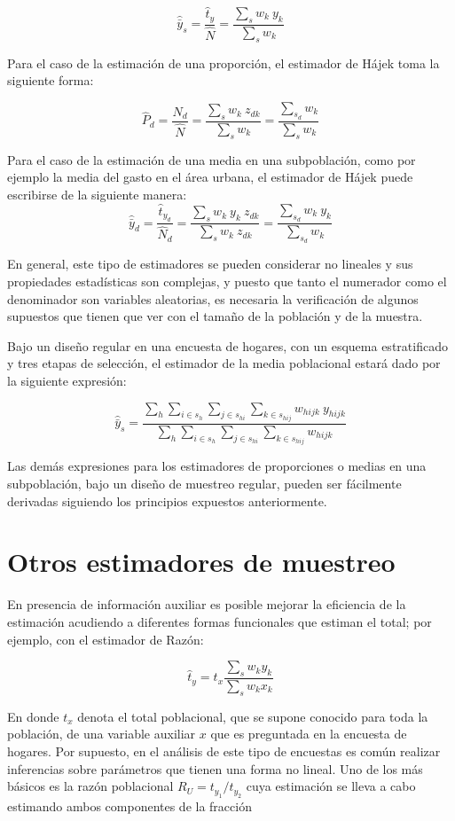 \documentclass[
  10pt,
  spanish,
]{book}
\begin{document}
\[
\hat{\bar{y}}_s=\frac{\hat t_y}{\hat N} = \frac{\sum_sw_k\ y_{k}}{\sum_sw_k}
\]

Para el caso de la estimación de una proporción, el estimador de Hájek toma la siguiente forma:

\[
\hat{P}_d=\frac{\hat N_d}{\hat N} = \frac{\sum_{s}w_k\ z_{dk}}{\sum_sw_k} = \frac{\sum_{s_d}w_k}{\sum_s w_k}
\]

Para el caso de la estimación de una media en una subpoblación, como por ejemplo la media del gasto en el área urbana, el estimador de Hájek puede escribirse de la siguiente manera:
\[
\hat{\bar{y}}_d=\frac{\hat t_{y_d}}{\hat N_d} = \frac{\sum_s w_k\ y_{k} \ z_{dk} }{\sum_s w_k \ z_{dk}} = \frac{\sum_{s_d} w_k\ y_{k}}{\sum_{s_d} w_k}
\]

En general, este tipo de estimadores se pueden considerar no lineales y sus propiedades estadísticas son complejas, y puesto que tanto el numerador como el denominador son variables aleatorias, es necesaria la verificación de algunos supuestos que tienen que ver con el tamaño de la población y de la muestra.

Bajo un diseño regular en una encuesta de hogares, con un esquema estratificado y tres etapas de selección, el estimador de la media poblacional estará dado por la siguiente expresión:

\[
\hat{\bar{y}}_s=\frac{\sum_h \sum_{i \in s_h} \sum_{j \in s_{hi}} \sum_{k \in s_{hij}} w_{hijk} \ y_{hijk}}{\sum_h \sum_{i \in s_h} \sum_{j \in s_{hi}} \sum_{k \in s_{hij}} w_{hijk} }
\]

Las demás expresiones para los estimadores de proporciones o medias en una subpoblación, bajo un diseño de muestreo regular, pueden ser fácilmente derivadas siguiendo los principios expuestos anteriormente.

\hypertarget{otros-estimadores-de-muestreo}{%
\section{Otros estimadores de muestreo}\label{otros-estimadores-de-muestreo}}

En presencia de información auxiliar es posible mejorar la eficiencia de la estimación acudiendo a diferentes formas funcionales que estiman el total; por ejemplo, con el estimador de Razón:

\[
\hat{t}_y = t_x \frac{\sum_s w_k y_k}{\sum_s w_k x_k}
\]

En donde \(t_x\) denota el total poblacional, que se supone conocido para toda la población, de una variable auxiliar \(x\) que es preguntada en la encuesta de hogares. Por supuesto, en el análisis de este tipo de encuestas es común realizar inferencias sobre parámetros que tienen una forma no lineal. Uno de los más básicos es la razón poblacional \(R_U = t_{y_1} / t_{y_2}\) cuya estimación se lleva a cabo estimando ambos componentes de la fracción
\end{document}
